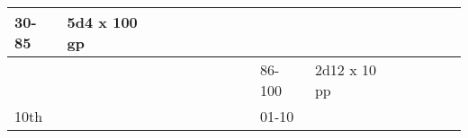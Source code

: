 \begin{longtable}{llllllllllllll}
{\begin{minipage}[t]{0.393in}
30-85\end{minipage}} & \multicolumn{1}{p{0.469in}|}{\begin{minipage}[t]{0.469in}\raggedright
5d4 x 100 gp\end{minipage}} & \multicolumn{1}{p{0.923in}|}{\begin{minipage}[t]{0.923in}\raggedright
\end{minipage}} & \multicolumn{1}{p{0.469in}|}{\begin{minipage}[t]{0.469in}\raggedright
\end{minipage}} & \multicolumn{1}{p{0.626in}|}{\begin{minipage}[t]{0.626in}\raggedright
\end{minipage}} & \multicolumn{1}{p{0.469in}|}{\begin{minipage}[t]{0.469in}\centering
\end{minipage}}\\
\hline
\multicolumn{8}{p{1.150in}|}{\begin{minipage}[t]{1.150in}\centering
\end{minipage}} & \multicolumn{1}{|p{0.393in}|}{\begin{minipage}[t]{0.393in}\raggedright
86-100\end{minipage}} & \multicolumn{1}{p{0.469in}|}{\begin{minipage}[t]{0.469in}\raggedright
2d12 x 10 pp\end{minipage}} & \multicolumn{1}{p{0.923in}|}{\begin{minipage}[t]{0.923in}\raggedright
\end{minipage}} & \multicolumn{1}{p{0.469in}|}{\begin{minipage}[t]{0.469in}\raggedright
\end{minipage}} & \multicolumn{1}{p{0.626in}|}{\begin{minipage}[t]{0.626in}\raggedright
\end{minipage}} & \multicolumn{1}{p{0.469in}|}{\begin{minipage}[t]{0.469in}\centering
\end{minipage}}\\
\hline
\multicolumn{8}{p{1.150in}|}{\begin{minipage}[t]{1.150in}\centering
10th\end{minipage}} & \multicolumn{1}{|p{0.393in}|}{\begin{minipage}[t]{0.393in}\raggedright
01-10\end{minipage}} & \multicolumn{1}{p{0.469in}|}{\begin{minipage}[t]{0.469in}\raggedright

\end{minipage}}
\end{longtable}
